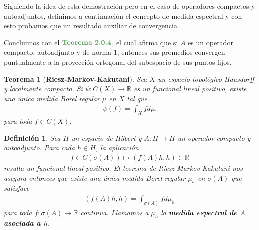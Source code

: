 \documentclass[11pt]{report}
\theoremstyle{colored}
\newtheorem{definition}{Definición}[section]
\newtheorem*{theorem*}{Teorema}
\newcommand{\R}{\mathbb{R}}
\newcommand{\ip}[1]{( #1 )}
\newcommand{\paint}[1]{\color{color}{#1}}
\newcommand{\tpaint}[1]{\paint{\textbf{#1}}}
\begin{document}
Siguiendo la idea de esta demostración pero en el caso de operadores compactos y autoadjuntos, definimos a continuación el concepto de medida espectral y con esto probamos que un resultado auxiliar de convergencia. 

Concluimos con el $\tpaint{Teorema 2.0.4}$, el cual afirma que si $A$ es un operador compacto, autoadjunto y de norma $1$, entonces sus promedios convergen puntualmente a la proyección ortogonal del subespacio de sus puntos fijos.
\\
\begin{tcolorbox}
\begin{theorem*}[\textbf{Riesz-Markov-Kakutani}] Sea $X$ un espacio topológico Hausdorff y localmente compacto. Si $\psi : C(X) \to \R$ es un funcional lineal positivo, existe una única medida Borel regular $\mu$ en $X$ tal que
\begin{align*}
\psi(f) = \int_X f d\mu.
\end{align*}
para toda $f \in C(X)$.
\end{theorem*}
\end{tcolorbox}

\begin{definition} Sea $H$ un espacio de Hilbert y $A : H \to H$ un operador compacto y autoadjunto. Para cada $h \in H$, la aplicación 
\begin{align*}
f \in C(\sigma(A)) \mapsto \ip{f(A)h,h} \in \R
\end{align*}
resulta un funcional lineal positivo. El teorema de Riesz-Markov-Kakutani nos asegura entonces que existe una única medida Borel regular $\mu_h$ en $\sigma(A)$ que satisface
\begin{align*}
\ip{f(A)h,h} = \int_{\sigma(A)} f d\mu_h
\end{align*}
para toda $f : \sigma(A) \to \R$ continua. Llamamos a $\mu_h$ la \textbf{medida espectral de $A$ asociada a $h$}.
\end{definition}
\end{document}
